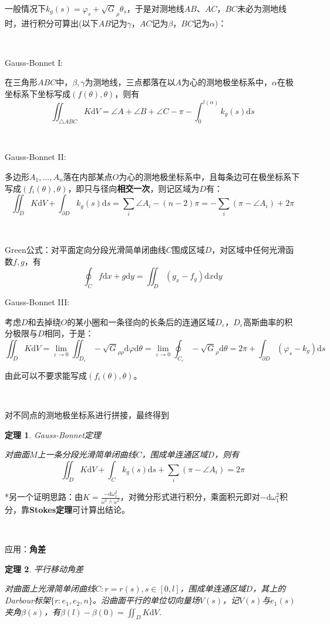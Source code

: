 \documentclass[a4paper,UTF8,fontset=windows]{ctexart}
\newtheorem{thm}{定理}[section]
\begin{document}
一般情况下$k_g(s)=\varphi_s+\sqrt{G}_\rho\theta_s$，于是对测地线$AB$、$AC$，$BC$未必为测地线时，进行积分可算出(以下$AB$记为$\gamma$，$AC$记为$\beta$，$BC$记为$\alpha$)：

\

Gauss-Bonnet I:

在三角形$ABC$中，$\beta,\gamma$为测地线，三点都落在以$A$为心的测地极坐标系中，$\alpha$在极坐标系下坐标写成$(f(\theta),\theta)$，则有
$$\iint_{\triangle ABC}K\mathrm{d}V=\angle A+\angle B+\angle C-\pi-\int_0^{l(\alpha)}k_g(s)\mathrm{d}s$$

\

Gauss-Bonnet II:

多边形$A_1,\dots,A_n$落在内部某点$O$为心的测地极坐标系中，且每条边可在极坐标系下写成$(f_i(\theta),\theta)$，即只与径向\textbf{相交一次}，则记区域为$D$有：
$$\iint_DK\mathrm{d}V+\int_{\partial D}k_g(s)\mathrm{d}s=\sum_i\angle A_i-(n-2)\pi=-\sum_i(\pi-\angle A_i)+2\pi$$

\

Green公式：对平面定向分段光滑简单闭曲线$C$围成区域$D$，对区域中任何光滑函数$f,g$，有$$\oint_Cf\mathrm{d}x+g\mathrm{d}y=\iint_D(g_x-f_y)\mathrm{d}x\mathrm{d}y$$

Gauss-Bonnet III:

考虑$D$和去掉绕$O$的某小圈和一条径向的长条后的连通区域$D_\varepsilon$，$D_\varepsilon$高斯曲率的积分极限与$D$相同，于是：
$$\iint_DK\mathrm{d}V=\lim_{\varepsilon\to0}\iint_{D_\varepsilon}-\sqrt{G}_{\rho\rho}\mathrm{d}\varphi\mathrm{d}\theta=\lim_{\varepsilon\to0}\oint_{C_\varepsilon}-\sqrt{G}_\rho\mathrm{d}\theta=2\pi+\int_{\partial D}(\varphi_s-k_g)\mathrm{d}s$$

由此可以不要求能写成$(f_i(\theta),\theta)$。

\

对不同点的测地极坐标系进行拼接，最终得到

\begin{thm} Gauss-Bonnet定理

对曲面$M$上一条分段光滑简单闭曲线$C$，围成单连通区域$D$，则有
$$\iint_DK\mathrm{d}V+\int_{C}k_g(s)\mathrm{d}s+\sum_i(\pi-\angle A_i)=2\pi$$
\end{thm}

*另一个证明思路：由$K=\frac{-\mathrm{d}\omega_1^2}{\omega^1\wedge\omega^2}$，对微分形式进行积分，乘面积元即对$-\mathrm{d}\omega_1^2$积分，靠\textbf{Stokes定理}可计算出结论。

\

应用：\textbf{角差}

\begin{thm} 平行移动角差

对曲面上光滑简单闭曲线$C:r=r(s),s\in[0,l]$，围成单连通区域$D$，其上的Darbour标架$\{r:e_1,e_2,n\}$。沿曲面平行的单位切向量场$V(s)$，记$V(s)$与$e_1(s)$夹角$\beta(s)$，有$\beta(l)-\beta(0)=\iint_DK\mathrm{d}V$.
\end{thm}
\end{document}
